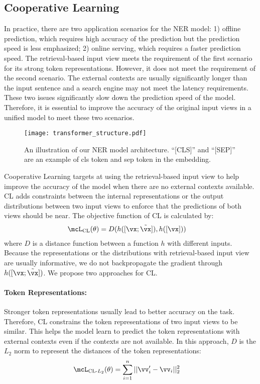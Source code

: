 \subsection{Cooperative Learning}
In practice, there are two application scenarios for the NER model: 1) offline prediction, which requires high accuracy of the prediction but the prediction speed is less emphasized; 2) online serving, which requires a faster prediction speed. The retrieval-based input view meets the requirement of the first scenario for its strong token representations. However, it does not meet the requirement of the second scenario. The external contexts are usually significantly longer than the input sentence and a search engine may not meet the latency requirements. These two issues significantly slow down the prediction speed of the model. Therefore, it is essential to improve the accuracy of the original input views in a unified model to meet these two scenarios.

\begin{figure}[t]
	\centering
	\texttt{[image: transformer\_structure.pdf]}
	\caption{An illustration of our NER model architecture. ``[CLS]'' and ``[SEP]'' are an example of cls token and sep token in the embedding. }
	\label{fig:ner}
\end{figure}

Cooperative Learning targets at using the retrieval-based input view to help improve the accuracy of the model when there are no external contexts available. CL adds constraints between the internal representations or the output distributions between two input views to enforce that the predictions of both views should be near. The objective function of CL is calculated by:
\begin{align}
\mcL_{\text{CL}}(\theta)&=D(h([\vx;\tilde{\vx}]), h([\vx])) \label{eq:cl_loss}
\end{align}
where $D$ is a distance function between a function $h$ with different inputs. Because the representations or the distributions with retrieval-based input view are usually informative, we do not backpropagate the gradient through $h([\vx;\tilde{\vx}])$. We propose two approaches for CL.

\paragraph{Token Representations:} Stronger token representations usually lead to better accuracy on the task. Therefore, CL constrains the token representations of two input views to be similar. This helps the model learn to predict the token representations with external contexts even if the contexts are not available. In this approach, $D$ is the $L_2$ norm to represent the distances of the token representations:
\begin{align}
\mcL_{\text{CL-$L_2$}}(\theta)&=\sum_{i=1}^n||\vv_{i}^{\prime}-\vv_{i}||_2^2 \label{eq:L2_loss}
\end{align}


